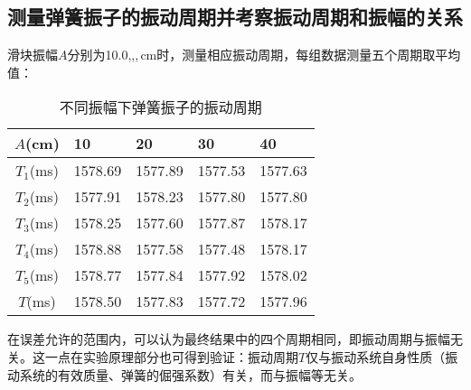 \documentclass[UTF-8,twoside,cs4size]{ctexart}
\begin{document}
	\subsection{测量弹簧振子的振动周期并考察振动周期和振幅的关系}\label{A-T}
	滑块振幅$ A $分别为10.0,,,\,cm时，测量相应振动周期，每组数据测量五个周期取平均值：
	\begin{table}[!h]
		\centering
		\renewcommand\arraystretch{1.5}
		\begin{tabularx}{\textwidth}{|c|Y|Y|Y|Y|}
			\hline
			$ A $\;(cm)&10&20&30&40\\
			\hline
			$ T_1 $\;(ms)&1578.69&1577.89&1577.53&1577.63\\
			\hline
			$ T_2 $\;(ms)&1577.91&1578.23&1577.80&1577.80\\
			\hline
			$ T_3 $\;(ms)&1578.25&1577.60&1577.87&1578.17\\
			\hline
			$ T_4 $\;(ms)&1578.88&1577.58&1577.48&1578.17\\
			\hline
			$ T_5 $\;(ms)&1578.77&1577.84&1577.92&1578.02\\
			\hline
			$ T $\;(ms)&1578.50&1577.83&1577.72&1577.96\\
			\hline
		\end{tabularx}
		\caption{不同振幅下弹簧振子的振动周期}
	\end{table}

	在误差允许的范围内，可以认为最终结果中的四个周期相同，即振动周期与振幅无关。这一点在实验原理部分也可得到验证：振动周期$ T $仅与振动系统自身性质（振动系统的有效质量、弹簧的倔强系数）有关，而与振幅等无关。
	
\end{document}
